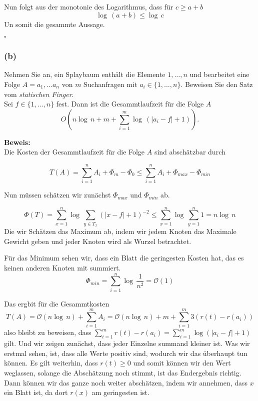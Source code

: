 \documentclass[11pt,a4paper,ngerman]{article}
\begin{document}
{Nun folgt aus der monotonie des Logarithmus, dass für $c \geq a+b$
$$
   \log \, (a+b) \leq \log \, c
$$
Un somit die gesammte Aussage.

\mbox{}\hfill$\square$

\subsubsection*{(b)}

Nehmen Sie an, ein Splaybaum enthält die Elemente $1, \ldots, n$ und bearbeitet eine Folge $A = a_1, \ldots a_n$ von $m$ Suchanfragen mit $a_i\in\{1,\ldots,n\}$. Beweisen Sie den Satz vom \emph{statischen Finger}.\\

Sei $f\in\{1,\ldots,n\}$ fest. Dann ist die Gesammtlaufzeit für die Folge $A$
$$
   O(n \log \, n + m + \sum_{i=1}^m \log \, (|a_i - f| + 1)).
$$

\noindent\textbf{Beweis:}\\

Die Kosten der Gesammtlaufzeit für die Folge $A$ sind abschätzbar durch

$$
	T(A) = \sum_{i=1}^n A_i + \Phi_m - \Phi_0 \leq \sum_{i=1}^n A_i + \Phi_{max} - \Phi_{min}
$$

Nun müssen schätzen wir zunächst $\Phi_{max}$ und $\Phi_{min}$ ab. 

$$
	\Phi(T) = \sum_{x=1}^n \log \, \sum_{y \in T_x} \left(|x - f| + 1\right)^{-2} \leq \sum_{x=1}^n \log \, \sum_{y=1}^n 1 = n \log \, n
$$
Die wir Schätzen das Maximum ab, indem wir jedem Knoten das Maximale Gewicht geben und jeder Knoten wird als Wurzel betrachtet.

Für das Minimum sehen wir, dass ein Blatt die geringesten Kosten hat, das es keinen anderen Knoten mit summiert.
$$
	\Phi_{min} = \sum_{i=1}^n \log \, \frac{1}{n^2} = \mathcal{O}(1)
$$

Das ergbit für die Gesammtkosten
$$
	T(A) = \mathcal{O}(n \log \, n) + \sum_{i=1}^m A_i = \mathcal{O}(n \log \, n) + m + \sum_{i=1}^m 3(r(t) - r(a_i))
$$
also bleibt zu beweisen, dass $\sum_{i=1}^m r(t) - r(a_i) = \sum_{i=1}^m \log (|a_i - f| + 1)$ gilt. Und wir zeigen
zunächst, dass jeder Einzelne summand kleiner ist. Was wir erstmal sehen, ist, dass alle Werte positiv sind, wodurch
wir das überhaupt tun können. Es gilt weiterhin, dass $r(t) \geq 0$ und somit können wir den Wert weglassen,
solange die Abschätzung noch stimmt, ist das Endergebnis richtig. Dann können wir das ganze noch weiter abschätzen, indem wir annehmen,
dass $x$ ein Blatt ist, da dort $r(x)$ am geringesten ist.

}
\end{document}
